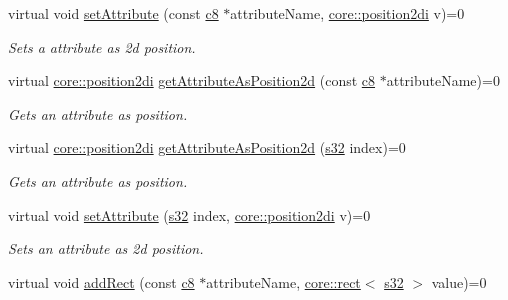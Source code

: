 \begin{DoxyCompactItemize}
virtual void \hyperlink{classirr_1_1io_1_1IAttributes_abd4c30bfab5a3755682b9fc902b04310}{set\+Attribute} (const \hyperlink{namespaceirr_a9395eaea339bcb546b319e9c96bf7410}{c8} $\ast$attribute\+Name, \hyperlink{namespaceirr_1_1core_ace0f1379db5f9f5660456ec57ab78202}{core\+::position2di} v)=0
\begin{DoxyCompactList}\small\item\em Sets a attribute as 2d position. \end{DoxyCompactList}\item 
virtual \hyperlink{namespaceirr_1_1core_ace0f1379db5f9f5660456ec57ab78202}{core\+::position2di} \hyperlink{classirr_1_1io_1_1IAttributes_abedde01b678c482be20735e4d730942f}{get\+Attribute\+As\+Position2d} (const \hyperlink{namespaceirr_a9395eaea339bcb546b319e9c96bf7410}{c8} $\ast$attribute\+Name)=0
\begin{DoxyCompactList}\small\item\em Gets an attribute as position. \end{DoxyCompactList}\item 
virtual \hyperlink{namespaceirr_1_1core_ace0f1379db5f9f5660456ec57ab78202}{core\+::position2di} \hyperlink{classirr_1_1io_1_1IAttributes_a11afd9cf70fb04706e26ef15a3423d9a}{get\+Attribute\+As\+Position2d} (\hyperlink{namespaceirr_ac66849b7a6ed16e30ebede579f9b47c6}{s32} index)=0
\begin{DoxyCompactList}\small\item\em Gets an attribute as position. \end{DoxyCompactList}\item 
\mbox{\label{classirr_1_1io_1_1IAttributes_a164e65ef2719645ee55d263f98d67530}} 
virtual void \hyperlink{classirr_1_1io_1_1IAttributes_a164e65ef2719645ee55d263f98d67530}{set\+Attribute} (\hyperlink{namespaceirr_ac66849b7a6ed16e30ebede579f9b47c6}{s32} index, \hyperlink{namespaceirr_1_1core_ace0f1379db5f9f5660456ec57ab78202}{core\+::position2di} v)=0
\begin{DoxyCompactList}\small\item\em Sets an attribute as 2d position. \end{DoxyCompactList}\item 
\mbox{\label{classirr_1_1io_1_1IAttributes_ab96f842013ac61bb75a460c073d90c57}} 
virtual void \hyperlink{classirr_1_1io_1_1IAttributes_ab96f842013ac61bb75a460c073d90c57}{add\+Rect} (const \hyperlink{namespaceirr_a9395eaea339bcb546b319e9c96bf7410}{c8} $\ast$attribute\+Name, \hyperlink{classirr_1_1core_1_1rect}{core\+::rect}$<$ \hyperlink{namespaceirr_ac66849b7a6ed16e30ebede579f9b47c6}{s32} $>$ value)=0

\end{DoxyCompactItemize}
